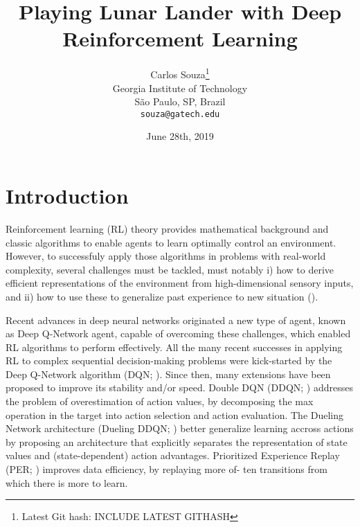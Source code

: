 \documentclass{article}
\title{Playing Lunar Lander with Deep Reinforcement Learning}
\date{June 28th, 2019}
\author{
Carlos Souza\thanks{Latest Git hash: INCLUDE LATEST GITHASH}\\
Georgia Institute of Technology\\
São Paulo, SP, Brazil \\
\texttt{souza@gatech.edu} \\
}
\begin{document}
    \maketitle

    \begin{abstract}
        \lipsum[1]
    \end{abstract}




    \section{Introduction}
    \label{sec:introduction}
    Reinforcement learning (RL) theory provides mathematical background and classic algorithms to enable agents to learn optimally control an environment.
    However, to successfuly apply those algorithms in problems with real-world complexity, several challenges must be tackled, must notably i) how to derive efficient representations of the environment from high-dimensional sensory inputs, and ii) how to use these to generalize past experience to new situation (\cite{dqn}).

    Recent advances in deep neural networks originated a new type of agent, known as Deep Q-Network agent, capable of overcoming these challenges, which enabled RL algorithms to perform effectively.
    All the many recent successes in applying RL to complex sequential decision-making problems were kick-started by the Deep Q-Network algorithm (DQN; \cite{dqn}).
    Since then, many extensions have been proposed to improve its stability and/or speed.
Double DQN (DDQN; \cite{ddqn}) addresses the problem of overestimation of action values, by decomposing the max operation in the target into action selection and action evaluation.
    The Dueling Network architecture (Dueling DDQN; \cite{dueling}) better generalize learning accross actions by proposing an architecture that explicitly separates the representation of state values and (state-dependent) action advantages.
    Prioritized Experience Replay (PER; \cite{per}) improves data efficiency, by replaying more of- ten transitions from which there is more to learn.






    \printbibliography
\end{document}
